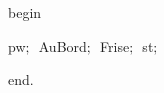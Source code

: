 {\vspace{\neglskip}\mbox{\blc  \idt  \mcl begin\idt }\par 
\vspace{\neglskip}\mbox{\blc  \blk\idt  pw$;$\ AuBord$;$\ Frise$;$\ st$;$}\par 
\vspace{\neglskip}\mbox{\blc  \idt  \mcl end\idt $.$}\par 

\medskip }

